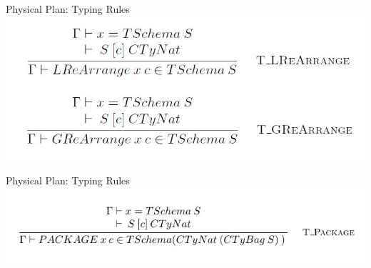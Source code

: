 \begin{frame}{Physical Plan: Typing Rules}
\centering
\includegraphics[scale=0.4]{Images/TypingRules/ReArrange.JPG}
\end{frame}

\begin{frame}{Physical Plan: Typing Rules}
\centering
\includegraphics[scale=0.5]{Images/TypingRules/Package.JPG}
\end{frame}


